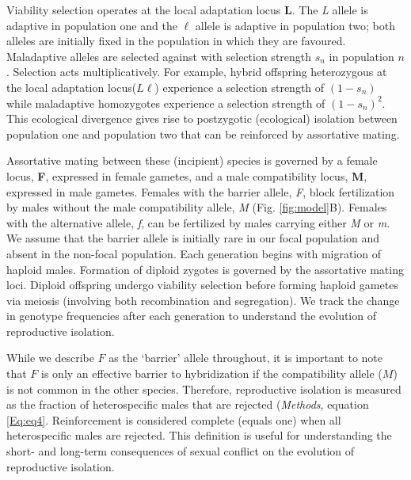 \documentclass[11pt]{article}
\begin{document}
Viability selection operates at the local adaptation locus \textbf{L}. The \emph{L} allele is adaptive in population one and the \emph{$\ell$} allele is adaptive in population two; both alleles are initially fixed in the population in which they are favoured. Maladaptive alleles are selected against with selection strength $s_n$ in population $n$.  Selection acts multiplicatively. For example, hybrid offspring heterozygous at the local adaptation locus($L \ell$) experience a selection strength of $(1-s_n)$ while maladaptive homozygotes experience a selection strength of $(1-s_n)^2$. This ecological divergence gives rise to postzygotic (ecological) isolation between population one and population two that can be reinforced by assortative mating.

Assortative mating between these (incipient) species is governed by a female locus, \textbf{F}, expressed in female gametes, and a male compatibility locus, \textbf{M}, expressed in male gametes.  Females with the barrier allele, \emph{F}, block fertilization by males without the male compatibility allele, \emph{M} (Fig. \ref{fig:model}B).  Females with the alternative allele, \emph{f}, can be fertilized by males carrying either \emph{M} or \emph{m}.  We assume that the barrier allele is initially rare in our focal population and absent in the non-focal population. Each generation begins with migration of haploid males.  Formation of diploid zygotes is governed by the assortative mating loci.  Diploid offspring undergo viability selection before forming haploid gametes via meiosis (involving both recombination and segregation). We track the change in genotype frequencies after each generation to understand the evolution of reproductive isolation.

While we describe $F$ as the `barrier' allele throughout, it is important to note that $F$ is only an effective barrier to hybridization if the compatibility allele ($M$) is not common in the other species.  Therefore, reproductive isolation is measured as the fraction of heterospecific males that are rejected (\emph{Methods}, equation \ref{Eq:eq4}. Reinforcement is considered complete (equals one) when all heterospecific males are rejected.  This definition is useful for understanding the short- and long-term consequences of sexual conflict on the evolution of reproductive isolation. 
\end{document}
